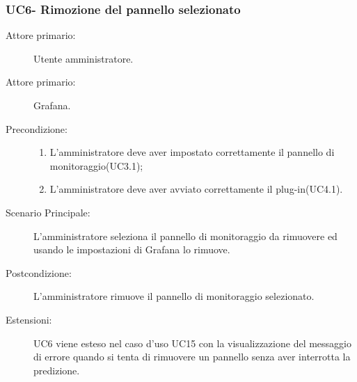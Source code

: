 \subsubsection{UC6- Rimozione del pannello selezionato}
\label{sssec:uc6}
\begin{description}
	\item[Attore primario:] Utente amministratore.
	\item[Attore primario:] Grafana.
	\item[Precondizione:]
	\begin{enumerate}
		\item L'amministratore deve aver impostato correttamente il pannello di monitoraggio(UC3.1);
		\item L'amministratore deve aver avviato correttamente il plug-in(UC4.1).
	\end{enumerate}		
	\item[Scenario Principale:] L'amministratore seleziona il pannello di monitoraggio da rimuovere ed usando le impostazioni di Grafana lo rimuove.
	\item[Postcondizione:] L'amministratore rimuove il pannello di monitoraggio selezionato.
	\item[Estensioni:] UC6 viene esteso nel caso d'uso UC15 con la visualizzazione del messaggio di errore quando si tenta di rimuovere un pannello senza aver interrotta la predizione.
\end{description}